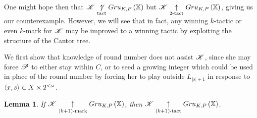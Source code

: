 \documentclass{amsart}
\newtheorem{lemma}[theorem]{Lemma}
\theoremstyle{definition}
\begin{document}
One might hope then that $\mathscr{K}\underset{\text{tact}}{\not\uparrow}Gru_{K,P}\left({\mathbb{X}}\right)$ but
$\mathscr{K}\underset{2\text{-tact}}{\uparrow}Gru_{K,P}\left({\mathbb{X}}\right)$, giving us our counterexample.
However, we will see that in fact, any winning $k$-tactic or even
$k$-mark for $\mathscr{K}$ may
be improved to a winning tactic by exploiting the structure of the Cantor tree.

We first show that knowledge of round number does not assist $\mathscr{K}$,
since she may force $\mathscr{P}$ to either stay within $C$, or to seed a growing
integer which could be used in place of the round number
by forcing her to play outside $L_{|s|+1}$ in response to
$\langle x,s\rangle\in X\times 2^{<\omega}$.

\begin{lemma}
  If $\mathscr{K}\underset{(k+1)\text{-mark}}{\uparrow}Gru_{K,P}\left({\mathbb{X}}\right)$, then
  $\mathscr{K}\underset{(k+1)\text{-tact}}{\uparrow}Gru_{K,P}\left({\mathbb{X}}\right)$.
\end{lemma}
\end{document}
